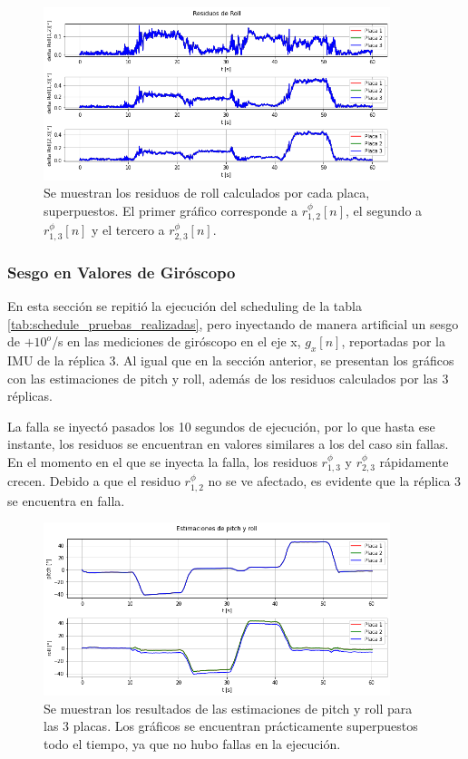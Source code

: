 \begin{figure}[H]
    \centering
    \includegraphics[width=0.9\textwidth]{img/resultados_residuos_roll_sin_fallas.png}
    \caption{Se muestran los residuos de roll calculados por cada placa, superpuestos. El primer gráfico corresponde a $r_{1,2}^{\phi}[n]$, el segundo a $r_{1,3}^{\phi}[n]$ y el tercero a $r_{2,3}^{\phi}[n]$.}
    \label{fig:resultados_residuos_roll_sin_fallas}
\end{figure}

\subsubsection{Sesgo en Valores de Giróscopo}

En esta sección se repitió la ejecución del scheduling de la tabla \ref{tab:schedule_pruebas_realizadas}, pero inyectando de manera artificial un sesgo de $+10 ^{o}$/s en las mediciones de giróscopo en el eje x, $g_x[n]$, reportadas por la IMU de la réplica 3. Al igual que en la sección anterior, se presentan los gráficos con las estimaciones de pitch y roll, además de los residuos calculados por las 3 réplicas.

La falla se inyectó pasados los 10 segundos de ejecución, por lo que hasta ese instante, los residuos se encuentran en valores similares a los del caso sin fallas. En el momento en el que se inyecta la falla, los residuos $r_{1,3}^{\phi}$ y $r_{2,3}^{\phi}$ rápidamente crecen. Debido a que el residuo $r_{1,2}^{\phi}$ no se ve afectado, es evidente que la réplica 3 se encuentra en falla.

\begin{figure}[H]
    \centering
    \includegraphics[width=0.9\textwidth]{img/resultados_pitch_roll_bias_giroscopo.png}
    \caption{Se muestran los resultados de las estimaciones de pitch y roll para las 3 placas. Los gráficos se encuentran prácticamente superpuestos todo el tiempo, ya que no hubo fallas en la ejecución.}
    \label{fig:resultados_pitch_roll_bias_giroscopo}
\end{figure}

